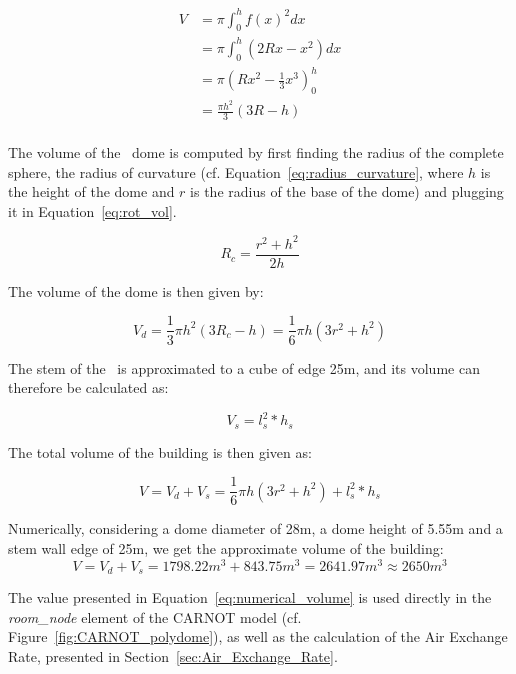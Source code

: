 \begin{equation}\label{eq:rot_vol}
    \begin{aligned}
        V &= \pi \int_0^h f(x)^2 dx \\
          &= \pi \int_0^h (2Rx - x^2)dx \\
          &= \pi \left( Rx^2 - \frac{1}{3}x^3 \right)_0^h \\
          &= \frac{\pi h^2}{3} (3R - h) \\
    \end{aligned}
\end{equation}

The volume of the \pdome\ dome is computed  by first finding the radius of the
complete sphere, the radius of curvature (cf.
Equation~\ref{eq:radius_curvature}, where $h$ is the height of the dome and $r$
is the radius of the base of the dome) and plugging it in
Equation~\ref{eq:rot_vol}.

\begin{equation}\label{eq:radius_curvature}
    R_c = \frac{r^2 + h^2}{2h}
\end{equation}

The volume of the dome is then given by: 

\begin{equation}
    V_d = \frac{1}{3} \pi h^2 (3R_c - h) = \frac{1}{6} \pi h (3r^2 + h^2)
\end{equation}

The stem of the \pdome\ is approximated to a cube of edge 25m, and its volume can
therefore be calculated as: 

\begin{equation}
    V_s = l_s^2 * h_s
\end{equation}

The total volume of the building is then given as: 

\begin{equation}
    V = V_d + V_s = \frac{1}{6} \pi h (3r^2 + h^2) + l_s^2 * h_s
\end{equation}

Numerically, considering a dome diameter of 28m, a dome height of 5.55m and a stem
wall edge of 25m, we get the approximate volume of the building:
\begin{equation}\label{eq:numerical_volume}
    V = V_d + V_s = 1798.22m^3 + 843.75m^3 = 2641.97m^3 \approx 2650m^3
\end{equation}

The value presented in Equation~\ref{eq:numerical_volume} is used directly in
the \textit{room\_node} element of the CARNOT model (cf.
Figure~\ref{fig:CARNOT_polydome}), as well as the calculation of the Air
Exchange Rate, presented in Section~\ref{sec:Air_Exchange_Rate}.

